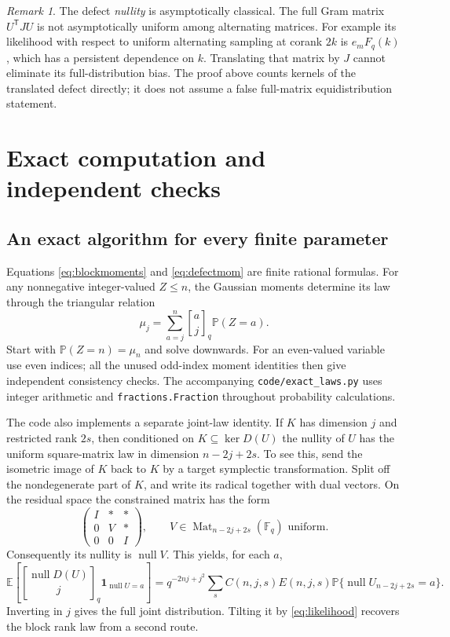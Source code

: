 \documentclass[11pt]{article}
\theoremstyle{definition}\newtheorem{definition}[theorem]{Definition}
\theoremstyle{remark}\newtheorem{remark}[theorem]{Remark}
\newcommand{\F}{\mathbb F}
\newcommand{\E}{\mathbb E}
\newcommand{\Prob}{\mathbb P}
\newcommand{\Mat}{\operatorname{Mat}}
\newcommand{\nul}{\operatorname{null}}
\newcommand{\gb}[2]{\genfrac{[}{]}{0pt}{}{#1}{#2}_{q}}
\newcommand{\1}{\mathbf 1}
\begin{document}
\begin{remark}
The defect \emph{nullity} is asymptotically classical. The full Gram matrix
$U^{\mathsf T}JU$ is not asymptotically uniform among alternating matrices.
For example its likelihood with respect to uniform alternating sampling
at corank $2k$ is $e_mF_q(k)$, which has a persistent dependence on $k$.
Translating that matrix by $J$ cannot eliminate its full-distribution bias.
The proof above counts kernels of the translated defect directly; it does
not assume a false full-matrix equidistribution statement.
\end{remark}

\section{Exact computation and independent checks}\label{sec:checks}

\subsection{An exact algorithm for every finite parameter}
Equations \eqref{eq:blockmoments} and \eqref{eq:defectmom} are finite
rational formulas. For any nonnegative integer-valued $Z\le n$, the
Gaussian moments determine its law through the triangular relation
\[
 \mu_j=\sum_{a=j}^n\gb aj\Prob(Z=a).
\]
Start with $\Prob(Z=n)=\mu_n$ and solve downwards. For an even-valued
variable use even indices; all the unused odd-index moment identities
then give independent consistency checks. The accompanying
\texttt{code/exact\_laws.py} uses integer arithmetic and
\texttt{fractions.Fraction} throughout probability calculations.

The code also implements a separate joint-law identity. If $K$ has
dimension $j$ and restricted rank $2s$, then conditioned on
$K\subseteq\ker D(U)$ the nullity of $U$ has the uniform square-matrix
law in dimension $n-2j+2s$. To see this, send the isometric image of $K$
back to $K$ by a target symplectic transformation. Split off the
nondegenerate part of $K$, and write its radical together with dual
vectors. On the residual space the constrained matrix has the form
\[
 \begin{pmatrix}I&*&*\\0&V&*\\0&0&I\end{pmatrix},
 \qquad V\in\Mat_{n-2j+2s}(\F_q)\text{ uniform}.
\]
Consequently its nullity is $\nul V$. This yields, for each $a$,
\begin{equation}\label{eq:joint}
 \E\left[\gb{\nul D(U)}j\1_{\nul U=a}\right]
 =q^{-2nj+j^2}\sum_s C(n,j,s)E(n,j,s)
            \Prob\{\nul U_{n-2j+2s}=a\}.
\end{equation}
Inverting in $j$ gives the full joint distribution. Tilting it by
\eqref{eq:likelihood} recovers the block rank law from a second route.
\end{document}
